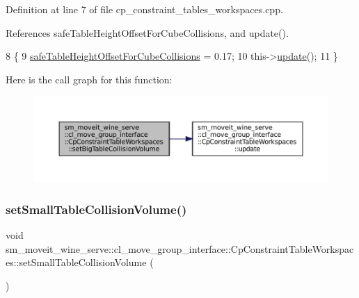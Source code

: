 Definition at line 7 of file cp\+\_\+constraint\+\_\+tables\+\_\+workspaces.\+cpp.



References safe\+Table\+Height\+Offset\+For\+Cube\+Collisions, and update().


\begin{DoxyCode}
8         \{
9             \hyperlink{classsm__moveit__wine__serve_1_1cl__move__group__interface_1_1CpConstraintTableWorkspaces_a5233fcac3ab6ce00f9e1c6e950462e58}{safeTableHeightOffsetForCubeCollisions} = 0.17;
10             this->\hyperlink{classsm__moveit__wine__serve_1_1cl__move__group__interface_1_1CpConstraintTableWorkspaces_af14a8a8c61b0dcfa6b062ba8493d5a5d}{update}();
11         \}
\end{DoxyCode}
Here is the call graph for this function\+:
\nopagebreak
\begin{figure}[H]
\begin{center}
\leavevmode
\includegraphics[width=350pt]{classsm__moveit__wine__serve_1_1cl__move__group__interface_1_1CpConstraintTableWorkspaces_aadce0ed924f3ea475d0bb7f892b18db9_cgraph}
\end{center}
\end{figure}
\mbox{\label{classsm__moveit__wine__serve_1_1cl__move__group__interface_1_1CpConstraintTableWorkspaces_ab059b21be65d4b79c14d73483e9ebfc6}} 
\subsubsection{\texorpdfstring{set\+Small\+Table\+Collision\+Volume()}{setSmallTableCollisionVolume()}}
{\footnotesize\ttfamily void sm\+\_\+moveit\+\_\+wine\+\_\+serve\+::cl\+\_\+move\+\_\+group\+\_\+interface\+::\+Cp\+Constraint\+Table\+Workspaces\+::set\+Small\+Table\+Collision\+Volume (\begin{DoxyParamCaption}{ }\end{DoxyParamCaption})}



